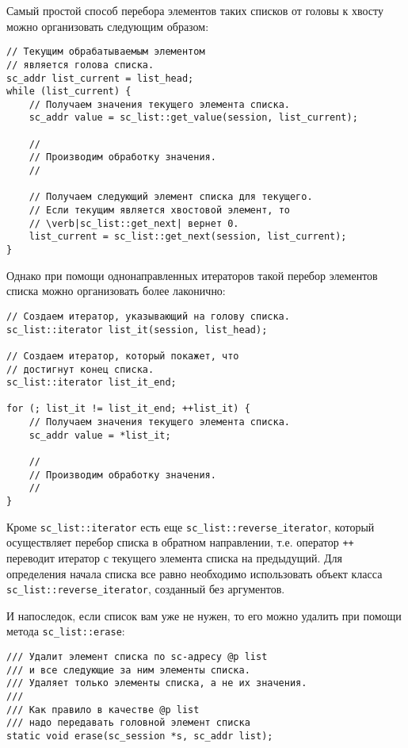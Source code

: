 Самый простой способ перебора элементов таких списков от головы к
хвосту можно организовать следующим образом:
\begin{lstlisting}[texcl]
// Текущим обрабатываемым элементом
// является голова списка.
sc_addr list_current = list_head;
while (list_current) {
    // Получаем значения текущего элемента списка.
    sc_addr value = sc_list::get_value(session, list_current);

    //
    // Производим обработку значения.
    //

    // Получаем следующий элемент списка для текущего.
    // Если текущим является хвостовой элемент, то
    // \verb|sc_list::get_next| вернет 0.
    list_current = sc_list::get_next(session, list_current);
}
\end{lstlisting}

Однако при помощи однонаправленных итераторов такой перебор элементов
списка можно организовать более лаконично:
\begin{lstlisting}[texcl]
// Создаем итератор, указывающий на голову списка.
sc_list::iterator list_it(session, list_head);

// Создаем итератор, который покажет, что
// достигнут конец списка.
sc_list::iterator list_it_end;

for (; list_it != list_it_end; ++list_it) {
    // Получаем значения текущего элемента списка.
    sc_addr value = *list_it;

    //
    // Производим обработку значения.
    //
}
\end{lstlisting}

Кроме \lstinline|sc_list::iterator| есть еще
\lstinline|sc_list::reverse_iterator|, который осуществляет перебор
списка в обратном направлении, т.е. оператор \verb|++| переводит итератор с
текущего элемента списка на предыдущий. Для определения начала списка
все равно необходимо использовать объект класса
\lstinline|sc_list::reverse_iterator|, созданный без аргументов.

И напоследок, если список вам уже не нужен, то его можно удалить при
помощи метода \lstinline|sc_list::erase|:
\begin{lstlisting}[texcl]
/// Удалит элемент списка по sc-адресу @p list
/// и все следующие за ним элементы списка.
/// Удаляет только элементы списка, а не их значения.
///
/// Как правило в качестве @p list
/// надо передавать головной элемент списка
static void erase(sc_session *s, sc_addr list);
\end{lstlisting}

